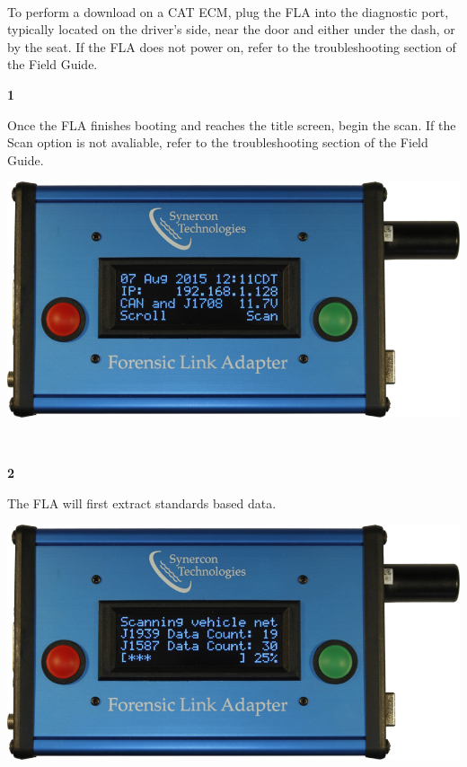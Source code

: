 \documentclass[11pt]{article}
\begin{document}
\paragraph{  }
To perform a download on a CAT ECM, plug the FLA into the diagnostic port, typically located on the driver's side, near the door and either under the dash, or by the seat. If the FLA does not power on, refer to the troubleshooting section of the Field Guide.
\\[\baselineskip]
\noindent\begin{minipage}{0.3\textwidth}%
\begin{center}
\textbf{1}\\[\baselineskip]
\end{center}
Once the FLA finishes booting and reaches the title screen, begin the scan. If the Scan option is not avaliable, refer to the troubleshooting section of the Field Guide.
\end{minipage}%
\hfill%
\begin{minipage}{0.6\textwidth}
\includegraphics[width=\linewidth]{../media/fla_screens/ethernet_and_others/main/title_both}
\end{minipage}
\\[\baselineskip]
\noindent\begin{minipage}{0.3\textwidth}%
\begin{center}
\textbf{2}\\[\baselineskip]
\end{center}
The FLA will first extract standards based data.
\end{minipage}%
\hfill%
\begin{minipage}{0.6\textwidth}
\includegraphics[width=\linewidth]{../media/fla_screens/ethernet_and_others/veh_scan/scan_25}
\end{minipage}
\end{document}
